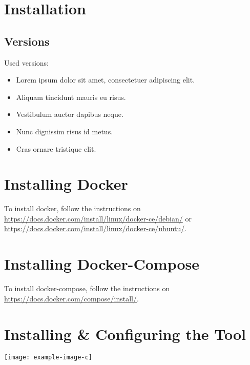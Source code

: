 \section{Installation}
\subsection{Versions}
Used versions:
\begin{itemize}
	\item Lorem ipsum dolor sit amet, consectetuer adipiscing elit.
	\item Aliquam tincidunt mauris eu risus.
	\item Vestibulum auctor dapibus neque.
	\item Nunc dignissim risus id metus.
	\item Cras ornare tristique elit.
\end{itemize}

\section{Installing Docker}
To install docker, follow the instructions on \url{https://docs.docker.com/install/linux/docker-ce/debian/} or \url{https://docs.docker.com/install/linux/docker-ce/ubuntu/}.

\section{Installing Docker-Compose}
To install docker-compose, follow the instructions on \url{https://docs.docker.com/compose/install/}.

\section{Installing \& Configuring the Tool}
\lipsum[3]

\noindent\texttt{[image: example-image-c]} 